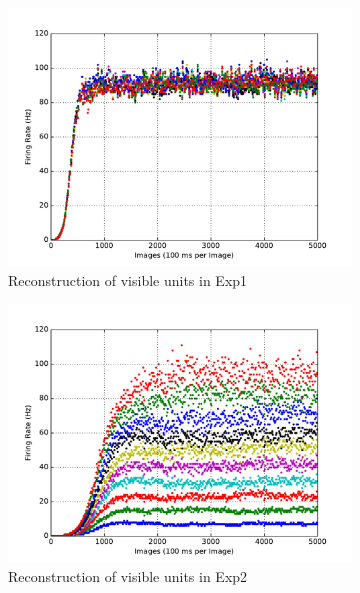 \begin{figure}
\begin{subfigure}[t]{0.4\textwidth}
	\end{subfigure}
	\begin{subfigure}[t]{0.4\textwidth}
		\includegraphics[width=\textwidth]{pics_sdlm/00_exp_SAE_Orig/exp1_recon_s.pdf}
		\caption{Reconstruction of visible units in Exp1}
	\end{subfigure}
	\begin{subfigure}[t]{0.4\textwidth}
		\includegraphics[width=\textwidth]{pics_sdlm/00_exp_SAE_Orig/exp2_recon_s.pdf}
		\caption{Reconstruction of visible units in Exp2}
	\end{subfigure}\\
	\begin{subfigure}[t]{0.4\textwidth}

\end{subfigure}
\end{figure}
